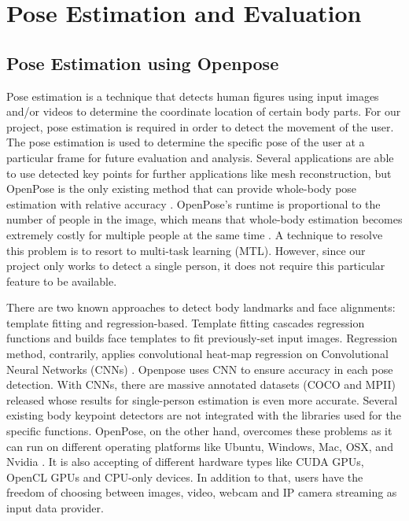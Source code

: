 \section{Pose Estimation and Evaluation}

\subsection{Pose Estimation using Openpose}
Pose estimation is a technique that detects human figures using input images and/or videos to determine the coordinate location of certain body parts. For our project, pose estimation is required in order to detect the movement of the user. The pose estimation is used to determine the specific pose of the user at a particular frame for future evaluation and analysis. Several applications are able to use detected key points for further applications like mesh reconstruction, but OpenPose is the only existing method that can provide whole-body pose estimation with relative accuracy \cite{wholebodyPoseEst}. OpenPose's runtime is proportional to the number of people in the image, which means that whole-body estimation becomes extremely costly  for multiple people at the same time \cite{wholebodyPoseEst}. A technique to resolve this problem is to resort to multi-task learning (MTL). However, since our project only works to detect a single person, it does not require this particular feature to be available. 


There are two known approaches to detect body landmarks and face alignments: template fitting and regression-based. Template fitting cascades regression functions and builds face templates to fit previously-set input images. Regression method, contrarily, applies convolutional heat-map regression on Convolutional Neural Networks (CNNs) \cite{wholebodyPoseEst}. Openpose uses CNN to ensure accuracy in each pose detection. With CNNs, there are massive annotated datasets (COCO and MPII) released whose results for single-person estimation is even more accurate. Several existing body keypoint detectors are not integrated with the libraries used for the specific functions. OpenPose, on the other hand, overcomes these problems as it can run on different operating platforms like Ubuntu, Windows, Mac, OSX, and Nvidia \cite{wholebodyPoseEst}. It is also accepting of different hardware types like CUDA GPUs, OpenCL GPUs and CPU-only devices. In addition to that, users have the freedom of choosing between images, video, webcam and IP camera streaming as input data provider. 


